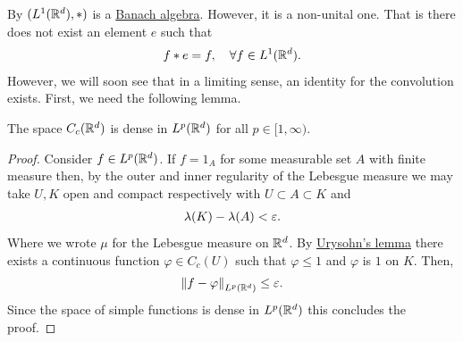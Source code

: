 \documentclass[
    a4paper,
    DIV=14,
    abstract=true,
    numbers=noenddot
]{scrartcl}
\begin{document}
By  $(L^1(\mathbb{R}^d),*)$ is a \href{https://en.wikipedia.org/wiki/Banach_algebra}{Banach algebra}. However, it is a non-unital one. That is there does not exist an element $e$ such that
\begin{align*}
	f*e=f , \quad\forall f \in L^1(\mathbb{R}^d).
\end{align*}
However, we will soon see that in a limiting sense, an identity for the convolution exists. First, we need the following lemma.
\begin{lemma}\label{Uryshon}
	The space $C_c(\mathbb{R}^d)$ is dense in $L^p(\mathbb{R}^d)$ for all $p \in [1,\infty)$.
\end{lemma}
\begin{proof}
	Consider $f \in  L^p(\mathbb{R}^d)$. If $f =1_A$ for some measurable set $A$ with finite measure then, by the outer and inner regularity of the Lebesgue measure we may take $U, K$ open and compact respectively with  $U \subset A \subset K$ and
	\begin{align*}
		\lambda  (K)-\lambda  (A) <\varepsilon .
	\end{align*}
	Where we wrote $\mu $ for the Lebesgue measure on $\mathbb{R}^d$.
	By \href{https://en.wikipedia.org/wiki/Urysohn%27s_lemma#:~:text=for%20any%20two-,non%2Dempty,-closed%20disjoint%20subsets}{Urysohn's lemma} there exists a continuous function $\varphi \in C_c(U)$ such that $\varphi \leq 1$ and $\varphi$ is $1$ on  $K$. Then,
	\begin{align*}
		\left\lVert f- \varphi \right\rVert_{L^p(\mathbb{R}^d)} \leq \varepsilon .
	\end{align*}
	Since the space of simple functions is dense in $L^p(\mathbb{R}^d)$ this concludes the proof.
\end{proof}
\end{document}
